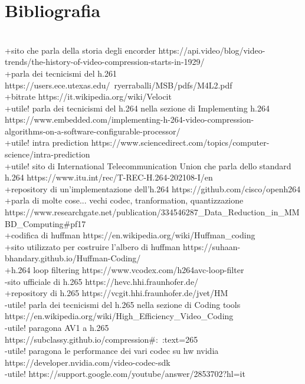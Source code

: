 \documentclass[a4paper,12pt, oneside]{article}
\begin{document}
\section{Bibliografia}
\\+sito che parla della storia degli encorder https://api.video/blog/video-trends/the-history-of-video-compression-starts-in-1929/
\\+parla dei tecnicismi del h.261 https://users.ece.utexas.edu/~ryerraballi/MSB/pdfs/M4L2.pdf
\\+bitrate https://it.wikipedia.org/wiki/Velocit%
\\+utile! parla dei tecnicismi del h.264 nella sezione di Implementing h.264 https://www.embedded.com/implementing-h-264-video-compression-\\algorithms-on-a-software-configurable-processor/
\\+utile! intra prediction https://www.sciencedirect.com/topics/computer-science/intra-prediction
\\+utile! sito di International Telecommunication Union che parla dello standard h.264 https://www.itu.int/rec/T-REC-H.264-202108-I/en
\\+repository di un'implementazione dell'h.264 https://github.com/cisco/openh264
\\+parla di molte cose... vechi codec, tranformation, quantizzazione https://www.researchgate.net/publication/334546287_Data_Reduction_in_MMBD_Computing#pf17
\\+codifica di huffman https://en.wikipedia.org/wiki/Huffman_coding
\\+sito utilizzato per costruire l'albero di huffman https://suhaan-bhandary.github.io/Huffman-Coding/
\\+h.264 loop filtering https://www.vcodex.com/h264avc-loop-filter
\\-sito ufficiale di h.265 https://hevc.hhi.fraunhofer.de/
\\+repository di h.265 https://vcgit.hhi.fraunhofer.de/jvet/HM
\\-utile! parla dei tecnicismi del h.265 nella sezione di Coding tools https://en.wikipedia.org/wiki/High_Efficiency_Video_Coding
\\-utile! paragona AV1 a h.265 https://subclassy.github.io/compression#:~:text=265%
\\-utile! paragona le performance dei vari codec su hw nvidia https://developer.nvidia.com/video-codec-sdk
\\-utile! https://support.google.com/youtube/answer/2853702?hl=it
\end{document}

